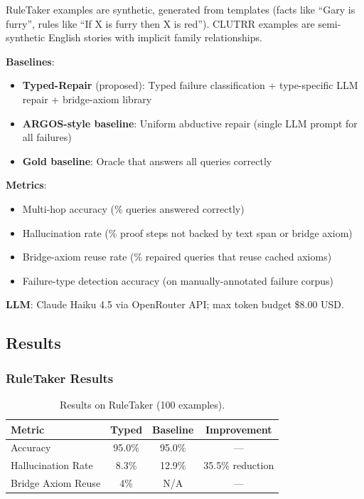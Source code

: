 \documentclass[11pt,letterpaper]{article}
\begin{document}
RuleTaker examples are synthetic, generated from templates (facts like ``Gary is
furry'', rules like ``If X is furry then X is red''). CLUTRR examples are
semi-synthetic English stories with implicit family relationships.

\textbf{Baselines}:
\begin{itemize}
  \item \textbf{Typed-Repair} (proposed): Typed failure classification + type-specific
    LLM repair + bridge-axiom library
  \item \textbf{ARGOS-style baseline}: Uniform abductive repair (single LLM prompt for
    all failures)
  \item \textbf{Gold baseline}: Oracle that answers all queries correctly
\end{itemize}

\textbf{Metrics}:
\begin{itemize}
  \item Multi-hop accuracy (\% queries answered correctly)
  \item Hallucination rate (\% proof steps not backed by text span or bridge axiom)
  \item Bridge-axiom reuse rate (\% repaired queries that reuse cached axioms)
  \item Failure-type detection accuracy (on manually-annotated failure corpus)
\end{itemize}

\textbf{LLM}: Claude Haiku 4.5 via OpenRouter API; max token budget \$8.00 USD.

\subsection{Results}

\subsubsection{RuleTaker Results}

\begin{table}[!htbp]
\centering
\caption{Results on RuleTaker (100 examples).}
\label{tab:ruletaker}
\begin{tabular}{lccc}
\toprule
Metric & Typed & Baseline & Improvement \\
\midrule
Accuracy & 95.0\% & 95.0\% & --- \\
Hallucination Rate & 8.3\% & 12.9\% & 35.5\% reduction \\
Bridge Axiom Reuse & 4\% & N/A & --- \\
\bottomrule
\end{tabular}
\end{table}
\end{document}
